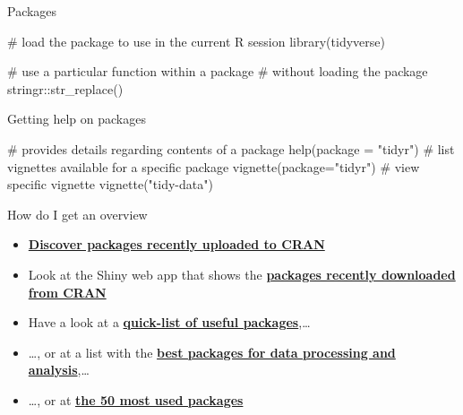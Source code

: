 \documentclass[
  10pt,
  ignorenonframetext,
]{beamer}
\newenvironment{Shaded}{\begin{snugshade}}{\end{snugshade}}
\newcommand{\CommentTok}[1]{\textcolor[rgb]{0.50,0.62,0.50}{#1}}
\newcommand{\DataTypeTok}[1]{\textcolor[rgb]{0.87,0.87,0.75}{#1}}
\newcommand{\KeywordTok}[1]{\textcolor[rgb]{0.94,0.87,0.69}{#1}}
\newcommand{\NormalTok}[1]{\textcolor[rgb]{0.80,0.80,0.80}{#1}}
\newcommand{\OperatorTok}[1]{\textcolor[rgb]{0.94,0.94,0.82}{#1}}
\newcommand{\StringTok}[1]{\textcolor[rgb]{0.80,0.58,0.58}{#1}}
\begin{document}
\begin{frame}[fragile]{Packages}
\protect\hypertarget{packages}{}

\begin{Shaded}
\begin{Highlighting}[]
\CommentTok{# load the package to use in the current R session}
\KeywordTok{library}\NormalTok{(tidyverse)}

\CommentTok{# use a particular function within a package }
\CommentTok{# without loading the package}
\NormalTok{stringr}\OperatorTok{::}\KeywordTok{str_replace}\NormalTok{()}
\end{Highlighting}
\end{Shaded}

\begin{block}{Getting help on packages}

\begin{Shaded}
\begin{Highlighting}[]
\CommentTok{# provides details regarding contents of a package}
\KeywordTok{help}\NormalTok{(}\DataTypeTok{package =} \StringTok{"tidyr"}\NormalTok{)}
\CommentTok{# list vignettes available for a specific package}
\KeywordTok{vignette}\NormalTok{(}\DataTypeTok{package=}\StringTok{"tidyr"}\NormalTok{)}
\CommentTok{# view specific vignette}
\KeywordTok{vignette}\NormalTok{(}\StringTok{"tidy-data"}\NormalTok{)}
\end{Highlighting}
\end{Shaded}

\end{block}

\end{frame}

\begin{frame}{How do I get an overview}
\protect\hypertarget{how-do-i-get-an-overview}{}

\begin{itemize}
\item
  \href{https://mran.microsoft.com/packages/}{\textbf{Discover packages
  recently uploaded to CRAN}}
\item
  Look at the Shiny web app that shows the
  \href{https://gallery.shinyapps.io/cran-gauge/}{\textbf{packages
  recently downloaded from CRAN}}
\item
  Have a look at a
  \href{https://support.rstudio.com/hc/en-us/articles/201057987-Quick-list-of-useful-R-packages}{\textbf{quick-list
  of useful packages}},\ldots{}
\item
  \ldots{}, or at a list with the
  \href{http://www.computerworld.com/article/2921176/business-intelligence/great-r-packages-for-data-import-wrangling-visualization.html}{\textbf{best
  packages for data processing and analysis}},\ldots{}
\item
  \ldots{}, or at
  \href{https://www.r-bloggers.com/the-50-most-used-r-packages/}{\textbf{the
  50 most used packages}}
\end{itemize}

\end{frame}
\end{document}
